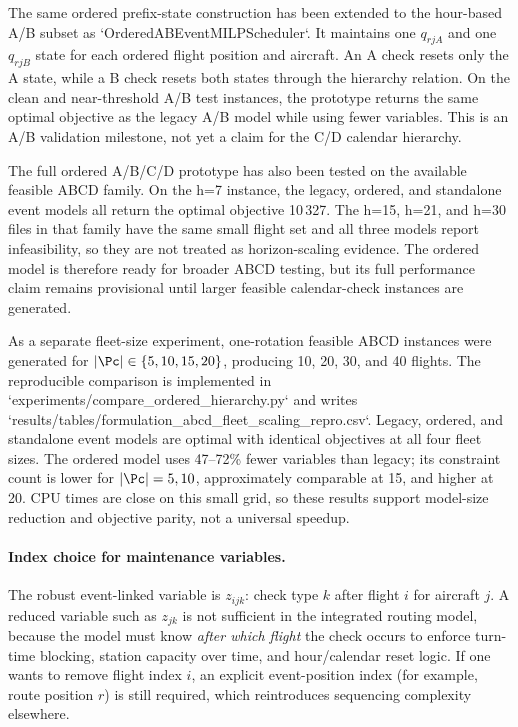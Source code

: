 \documentclass[11pt,a4paper]{article}
\begin{document}
The same ordered prefix-state construction has been extended to the
hour-based A/B subset as `OrderedABEventMILPScheduler`. It maintains one
$q_{rjA}$ and one $q_{rjB}$ state for each ordered flight position and aircraft.
An A check resets only the A state, while a B check resets both states through
the hierarchy relation. On the clean and near-threshold A/B test instances,
the prototype returns the same optimal objective as the legacy A/B model while
using fewer variables. This is an A/B validation milestone, not yet a claim
for the C/D calendar hierarchy.

The full ordered A/B/C/D prototype has also been tested on the available
feasible ABCD family. On the h=7 instance, the legacy, ordered, and standalone
event models all return the optimal objective 10\,327. The h=15, h=21, and
h=30 files in that family have the same small flight set and all three models
report infeasibility, so they are not treated as horizon-scaling evidence.
The ordered model is therefore ready for broader ABCD testing, but its full
performance claim remains provisional until larger feasible calendar-check
instances are generated.

As a separate fleet-size experiment, one-rotation feasible ABCD instances
were generated for $|\Pc|\in\{5,10,15,20\}$, producing 10, 20, 30, and 40
flights. The reproducible comparison is implemented in
`experiments/compare_ordered_hierarchy.py` and writes
`results/tables/formulation_abcd_fleet_scaling_repro.csv`. Legacy, ordered,
and standalone event models are optimal with identical objectives at all four
fleet sizes. The ordered model uses 47--72\% fewer variables than legacy; its
constraint count is lower for $|\Pc|=5,10$, approximately comparable at 15,
and higher at 20. CPU times are close on this small grid, so these results
support model-size reduction and objective parity, not a universal speedup.

\paragraph{Index choice for maintenance variables.}
The robust event-linked variable is $z_{ijk}$: check type $k$ after flight $i$
for aircraft $j$. A reduced variable such as $z_{jk}$ is not sufficient in the
integrated routing model, because the model must know \emph{after which flight}
the check occurs to enforce turn-time blocking, station capacity over time, and
hour/calendar reset logic. If one wants to remove flight index $i$, an explicit
event-position index (for example, route position $r$) is still required,
which reintroduces sequencing complexity elsewhere.
\end{document}
